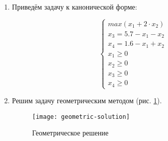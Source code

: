 \begin{enumerate}
	
\item Приведём задачу к канонической форме:

\begin{equation}
\begin{cases}
	max \left( x_1 + 2 \cdot x_2 \right)
	\\
	x_3 = 5.7 - x_1 - x_2
	\\
	x_4 = 1.6 - x_1 + x_2
	\\
	x_1 \geq 0
	\\
	x_2 \geq 0
	\\
	x_3 \geq 0	
	\\
	x_4 \geq 0
\end{cases}
\end{equation}	

\item Решим задачу геометрическим методом (рис. \ref{pic:graphic-solution}).

\begin{figure}[H]
\begin{center}
	\texttt{[image: geometric-solution]}
	\caption{Геометрическое решение}
	\label{pic:graphic-solution}
\end{center}
\end{figure}

\end{enumerate}

